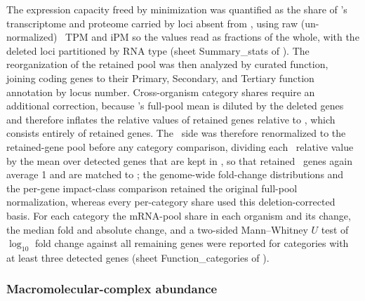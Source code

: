 The expression capacity freed by minimization was quantified as the share of \syn's transcriptome and proteome carried by loci absent from \syna, using raw (un-normalized) \syn~TPM and iPM so the values read as fractions of the whole, with the deleted loci partitioned by RNA type (sheet Summary\_stats of \sdreduction).
The reorganization of the retained pool was then analyzed by curated function, joining coding genes to their Primary, Secondary, and Tertiary function annotation by locus number.
Cross-organism category shares require an additional correction, because \syn's full-pool mean is diluted by the deleted genes and therefore inflates the relative values of retained genes relative to \syna, which consists entirely of retained genes.
The \syn~side was therefore renormalized to the retained-gene pool before any category comparison, dividing each \syn~relative value by the mean over detected genes that are kept in \syna, so that retained \syn~genes again average 1 and are matched to \syna; the genome-wide fold-change distributions and the per-gene impact-class comparison retained the original full-pool normalization, whereas every per-category share used this deletion-corrected basis.
For each category the mRNA-pool share in each organism and its change, the median fold and absolute change, and a two-sided Mann--Whitney $U$ test of $\log_{10}$ fold change against all remaining genes were reported for categories with at least three detected genes (sheet Function\_categories of \sdreduction).

\subsubsection{Macromolecular-complex abundance}

